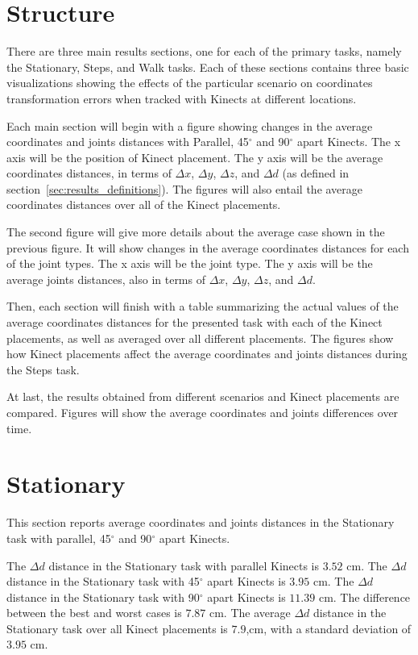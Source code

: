 \section{Structure}
\label{sec:results_structure}

There are three main results sections, one for each of the primary tasks, namely the Stationary, Steps, and Walk tasks. Each of these sections contains three basic visualizations showing the effects of the particular scenario on coordinates transformation errors when tracked with Kinects at different locations.

Each main section will begin with a figure showing changes in the average coordinates and joints distances with Parallel, 45$^{\circ}$ and 90$^{\circ}$ apart Kinects. The x axis will be the position of Kinect placement. The y axis will be the average coordinates distances, in terms of $\Delta x$, $\Delta y$, $\Delta z$, and $\Delta d$ (as defined in section~\ref{sec:results_definitions}). The figures will also entail the average coordinates distances over all of the Kinect placements.

The second figure will give more details about the average case shown in the previous figure. It will show changes in the average coordinates distances for each of the joint types. The x axis will be the joint type. The y axis will be the average joints distances, also in terms of $\Delta x$, $\Delta y$, $\Delta z$, and $\Delta d$.

Then, each section will finish with a table summarizing the actual values of the average coordinates distances for the presented task with each of the Kinect placements, as well as averaged over all different placements. The figures show how Kinect placements affect the average coordinates and joints distances during the Steps task.

At last, the results obtained from different scenarios and Kinect placements are compared. Figures will show the average coordinates and joints differences over time.

\section{Stationary}
\label{sec:results_stationary}

This section reports average coordinates and joints distances in the Stationary task with parallel, 45$^{\circ}$ and 90$^{\circ}$ apart Kinects.

The $\Delta d$ distance in the Stationary task with parallel Kinects is $3.52$ cm. The $\Delta d$ distance in the Stationary task with 45$^{\circ}$ apart Kinects is $3.95$ cm. The $\Delta d$ distance in the Stationary task with 90$^{\circ}$ apart Kinects is $11.39$ cm. The difference between the best and worst cases is $7.87$ cm. The average $\Delta d$ distance in the Stationary task over all Kinect placements is $7.9$,cm, with a standard deviation of $3.95$ cm.


